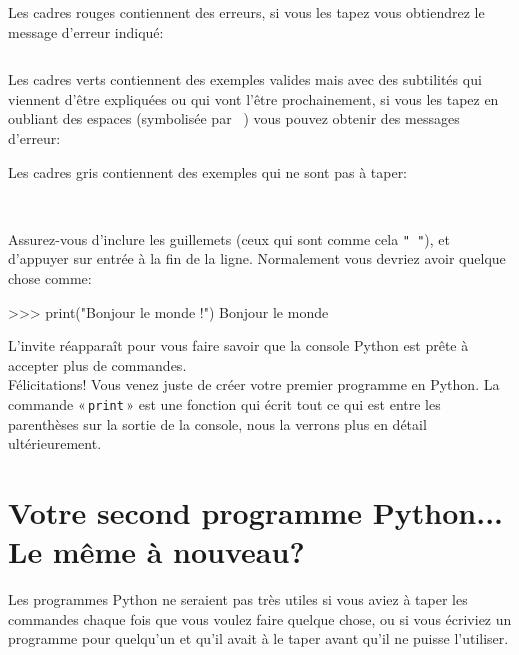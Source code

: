 Les cadres rouges contiennent des erreurs, si vous les tapez vous obtiendrez le message d'erreur indiqué:

\begin{Verbatim}[frame=single,rulecolor=\color{red}, label=erreur]

\end{Verbatim}

Les cadres verts contiennent des exemples valides mais avec des subtilités qui viennent d'être expliquées ou qui vont l'être prochainement, si vous les tapez en oubliant des espaces (symbolisée par \verb*+ +) vous pouvez obtenir des messages d'erreur:

\begin{Verbatim*}[frame=single,rulecolor=\color{green}, label=à taper avec attention]
 
\end{Verbatim*}
Les cadres gris contiennent des exemples qui ne sont pas à taper:

\begin{Verbatim}[frame=single,rulecolor=\color{gray}, label=ne pas saisir]
 
\end{Verbatim}


Assurez-vous d'inclure les guillemets (ceux qui sont comme cela \texttt{" "}), et d'appuyer sur entrée à la fin de la ligne.
Normalement vous devriez avoir quelque chose comme:

\begin{Verbatim*}[frame=single,rulecolor=\color{mbleu}, label=à taper si cela n'est pas déjà fait]
>>> print("Bonjour le monde !")
Bonjour le monde
\end{Verbatim*}


L'invite réapparaît pour vous faire savoir que la console Python est prête à accepter plus de commandes.
\\


Félicitations! Vous venez juste de créer votre premier programme en Python. La commande « \verb+print+ » est une fonction qui écrit tout ce qui est entre les parenthèses sur la sortie de la console, nous la verrons plus en détail ultérieurement.

\section{Votre second programme Python... Le même à nouveau?}

Les programmes Python ne seraient pas très utiles si vous aviez à taper les commandes chaque fois que vous voulez faire quelque chose, ou si vous écriviez un programme pour quel\-qu'un et qu'il avait à le taper avant qu'il ne puisse l'utiliser.

